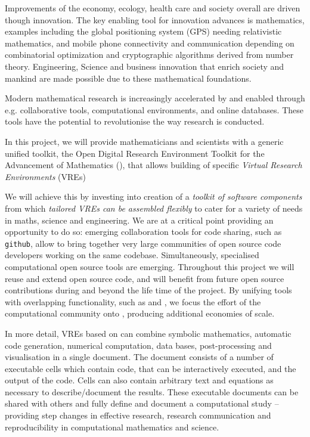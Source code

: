 Improvements of the economy, ecology, health care and society overall
are driven though innovation. The key enabling tool for innovation
advances is mathematics, examples including the global positioning
system (GPS) needing relativistic mathematics, and mobile phone
connectivity and communication depending on combinatorial optimization
and cryptographic algorithms derived from number theory. Engineering,
Science and business innovation that enrich society and mankind are
made possible due to these mathematical foundations.

Modern mathematical research is increasingly accelerated by and
enabled through e.g. collaborative tools, computational environments,
and online databases.
These tools have the potential to
revolutionise the way research is conducted. 

In this project, we will provide mathematicians and scientists with a
generic unified toolkit, the Open Digital Research Environment Toolkit
for the Advancement of Mathematics (\TheProject), that allows
building of specific \emph{Virtual Research Environments} (VREs)


We will achieve this by investing into creation of a \emph{toolkit of
  software components} from which \emph{tailored VREs can be assembled
  flexibly} to cater for a variety of needs in maths, science and
engineering.  We are at a critical point providing an opportunity to
do so: emerging collaboration tools for code sharing, such as \texttt{github},
allow to bring together very large communities of open source code developers
working on the same codebase.  Simultaneously, specialised
computational open source tools are emerging. Throughout this project
we will reuse and extend open source code, and \TheProject will benefit
from future open source contributions during and beyond the life time
of the project. By unifying tools with overlapping functionality, such as \Jupyter and \Sage, we
focus the effort of the computational community onto \TheProject, producing additional economies of scale. 

In more detail, VREs based on \TheProject can combine symbolic
mathematics, automatic code generation, numerical computation, data
bases, post-processing and visualisation in a single document. The
document consists of a number of executable cells which contain code,
that can be interactively executed, and the output of the code. Cells
can also contain arbitrary text and equations as necessary to
describe/document the results. These executable documents can be
shared with others and fully define and document a computational study
-- providing step changes in effective research, research
communication and reproducibility in computational mathematics and science. 

